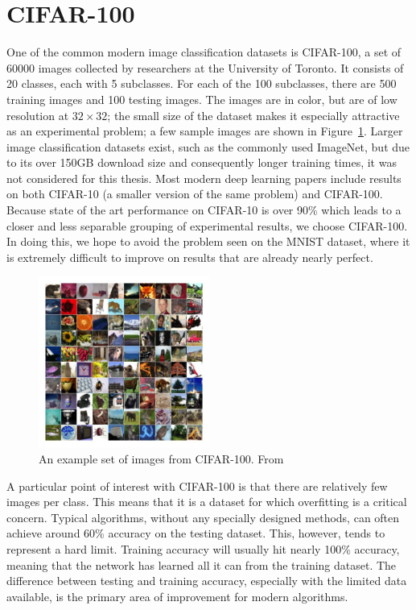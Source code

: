 \section{CIFAR-100}
One of the common modern image classification datasets is CIFAR-100, a set of 60000 images collected by researchers at the University of Toronto.
It consists of 20 classes, each with 5 subclasses.
For each of the 100 subclasses, there are 500 training images and 100 testing images.
The images are in color, but are of low resolution at $32\times 32$; the small size of the dataset makes it especially attractive as an experimental problem; a few sample images are shown in Figure~\ref{fig:cifar100}.
Larger image classification datasets exist, such as the commonly used ImageNet, but due to its over 150GB download size and consequently longer training times, it was not considered for this thesis.
Most modern deep learning papers include results on both CIFAR-10 (a smaller version of the same problem) and CIFAR-100. Because state of the art performance on CIFAR-10 is over 90\% which leads to a closer and less separable grouping of experimental results, we choose CIFAR-100.
In doing this, we hope to avoid the problem seen on the MNIST dataset, where it is extremely difficult to improve on results that are already nearly perfect.

\begin{figure}[!htb]
\centering
\includegraphics[width=0.5\textwidth]{images/cifar100}
\caption{An example set of images from CIFAR-100. From \cite{cifar100-sample}}
\label{fig:cifar100}
\end{figure}

A particular point of interest with CIFAR-100 is that there are relatively few images per class.
This means that it is a dataset for which overfitting is a critical concern.
Typical algorithms, without any specially designed methods, can often achieve around 60\% accuracy on the testing dataset.
This, however, tends to represent a hard limit.
Training accuracy will usually hit nearly 100\% accuracy, meaning that the network has learned all it can from the training dataset.
The difference between testing and training accuracy, especially with the limited data available, is the primary area of improvement for modern algorithms.

